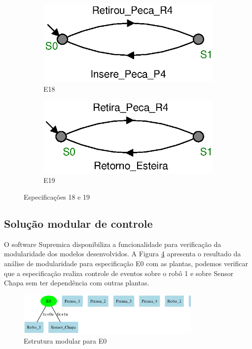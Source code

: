 \begin{figure}[H]%
  \centering
  \begin{subfigure}{0.45\textwidth}
      \centering
      \includegraphics[width=\textwidth]{imagens/E18.eps}
      \caption{E18}
      \label{fig:e18}
  \end{subfigure}
  \hfill
  \begin{subfigure}{0.45\textwidth}
      \centering
      \includegraphics[width=\textwidth]{imagens/E19.eps}
      \caption{E19}
      \label{fig:e19}
  \end{subfigure}
  \caption{Especificações 18 e 19}
  \label{fig:e1819}
\end{figure}

\subsection{Solução modular de controle}
O software Supremica \cite{Supremica2020} disponibiliza a funcionalidade para verificação da modularidade dos modelos desenvolvidos.
A Figura \ref{fig:modulare0} apresenta o resultado da análise de modularidade para especificação E0 com as plantas, podemos verificar que a especificação realiza controle de eventos sobre o robô 1 e sobre Sensor Chapa sem ter dependência com outras plantas.

\begin{figure}[H]%
  \centering
  \includegraphics[width=0.8\textwidth]{imagens/modular-E0.eps}
  \caption{Estrutura modular para E0}\label{fig:modulare0}
\end{figure}

